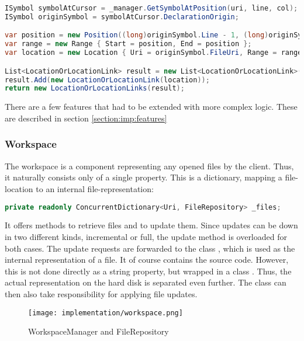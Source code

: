 \begin{lstlisting}[language=csharp, caption={GoToDefinition, Core Provider}, captionpos=b, label={lst:gotoProvierExample}]
ISymbol symbolAtCursor = _manager.GetSymbolAtPosition(uri, line, col);
ISymbol originSymbol = symbolAtCursor.DeclarationOrigin;

var position = new Position((long)originSymbol.Line - 1, (long)originSymbol.Column - 1);
var range = new Range { Start = position, End = position };
var location = new Location { Uri = originSymbol.FileUri, Range = range };

List<LocationOrLocationLink> result = new List<LocationOrLocationLink>();
result.Add(new LocationOrLocationLink(location));
return new LocationOrLocationLinks(result);
\end{lstlisting}

There are a few features that had to be extended with more complex logic.
These are described in section \ref{section:imp:features}

\subsubsection{Workspace}
The workspace is a component representing any opened files by the client.
Thus, it naturally consists only of a single property.
This is a dictionary, mapping a file-location to an internal file-representation:

\begin{lstlisting}[language=csharp, caption={Workspace Property}, captionpos=b, label={lst:workspaceproperty}]
private readonly ConcurrentDictionary<Uri, FileRepository> _files;
\end{lstlisting}

It offers methods to retrieve files and to update them.
Since updates can be down in two different kinds, incremental or full, the update method is overloaded for both cases.
The update requests are forwarded to the class , which is used as the internal representation of a file.
It of course contains the source code.
However, this is not done directly as a string property, but wrapped in a class .
Thus, the actual representation on the hard disk is separated even further.
The  class can then also take responsibility for applying file updates.\\

\begin{figure}[h]
    \centering
    \texttt{[image: implementation/workspace.png]}
    \caption{WorkspaceManager and FileRepository}
    \label{fig:worksapceAndRepo}
\end{figure}

